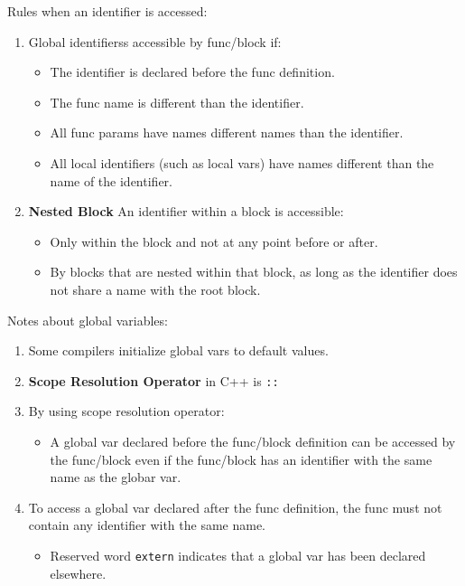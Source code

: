 \documentclass{article}
\begin{document}
\vspace{8pt}
Rules when an identifier is accessed:
\begin{enumerate}
  \item Global identifierss accessible by func/block if:
  \begin{itemize}
    \item The identifier is declared before the func definition.
    \item The func name is different than the identifier.
    \item All func params have names different names than the identifier.
    \item All local identifiers (such as local vars) have names different than
      the name of the identifier.
  \end{itemize}
  \item \textbf{Nested Block} An identifier within a block is accessible:
  \begin{itemize}
    \item Only within the block and not at any point before or after.
    \item By blocks that are nested within that block, as long as the identifier
      does not share a name with the root block.
  \end{itemize}
\end{enumerate}

Notes about global variables:
\begin{enumerate}
  \item Some compilers initialize global vars to default values.
  \item \textbf{Scope Resolution Operator} in C++ is \texttt{::}
  \item By using scope resolution operator:
  \begin{itemize}
    \item A global var declared before the func/block definition can be accessed
      by the func/block even if the func/block has an identifier with the same
      name as the globar var.
  \end{itemize}
  \item To access a global var declared after the func definition, the func must
    not contain any identifier with the same name.
  \begin{itemize}
    \item Reserved word \texttt{extern} indicates that a global var has been
      declared elsewhere.
  \end{itemize}
\end{enumerate}
\end{document}
